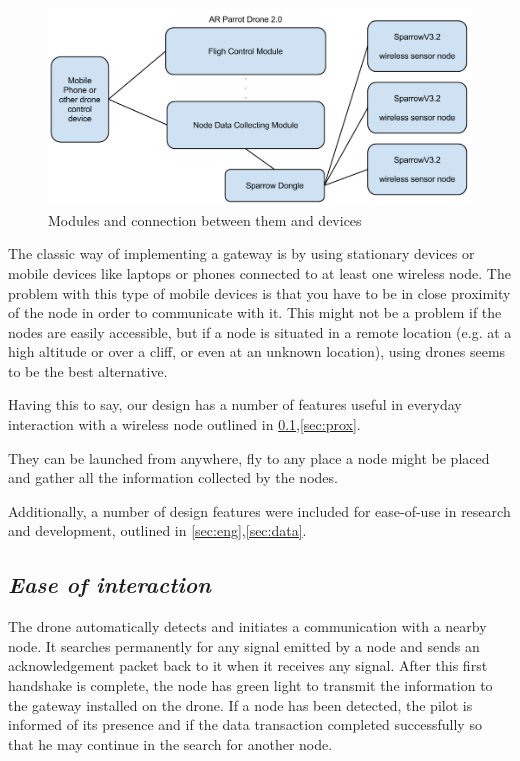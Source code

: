 \label{chap:arch}

\begin{figure}[ht] \centering
\includegraphics[width=1\textwidth]{img/organigrama.png}
\caption{Modules and connection between them and devices} \end{figure}

The classic way of implementing a gateway is by using stationary devices or mobile devices like laptops or phones connected to at least one wireless node. The problem with this type of mobile devices is that you have to be in close proximity of the node in order to communicate with it. This might not be a problem if the nodes are easily accessible, but if a node is situated in a remote location (e.g. at a high altitude or over a cliff, or even at an unknown location), using drones seems to be the best alternative.

Having this to say, our design has a number of features useful in everyday interaction with a wireless node outlined in \ref{sec:inter},\ref{sec:prox}. 

They can be launched from anywhere, fly to any place a node might be placed and gather all the information collected by the nodes.

Additionally, a number of design features were included for ease-of-use in
research and development, outlined in \ref{sec:eng},\ref{sec:data}.


\subsection{\textit{Ease of interaction}} 

\label{sec:inter}

The drone automatically detects and initiates a communication with a nearby node. It searches permanently for any signal emitted by a node and sends an acknowledgement packet back to it when it receives any signal. After this first handshake is complete, the node has green light to transmit the information to the gateway installed on the drone. If a node has been detected, the pilot is informed of its presence and if the data transaction completed successfully so that he may continue in the search for another node.

